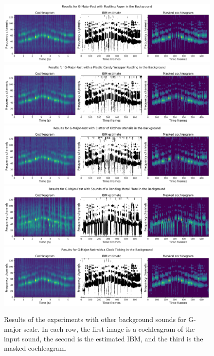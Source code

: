 \begin{figure}[htp]
	\centering
	\includegraphics[width=\textwidth]{include/experiments_G-major-fast_BG2.jpg}
	\includegraphics[width=\textwidth]{include/experiments_G-major-fast_BG3.jpg}
	\includegraphics[width=\textwidth]{include/experiments_G-major-fast_BG6.jpg}
	\includegraphics[width=\textwidth]{include/experiments_G-major-fast_BG17.jpg}
	\includegraphics[width=\textwidth]{include/experiments_G-major-fast_BG27.jpg}
	\caption[Results of experiments with other background sounds]{Results of the experiments with other background sounds for G-major scale. In each row, the first image is a cochleagram of the input sound, the second is the estimated IBM, and the third is the masked cochleagram.}
	\label{img:other_backgrounds_experiments}
\end{figure}

